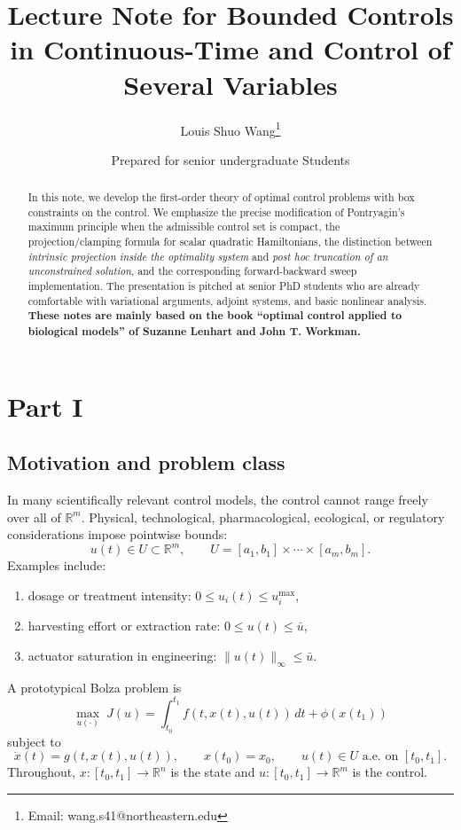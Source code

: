 \documentclass[11pt]{article}
\title{\textbf{Lecture Note for Bounded Controls in Continuous-Time and Control of Several Variables}}
\author{Louis Shuo Wang\thanks{Email: wang.s41@northeastern.edu}}
\affil{Department of Mathematics, Northeastern University, Boston, MA 02115, USA}
\date{Prepared for senior undergraduate Students}
\theoremstyle{definition}
\newcommand{\R}{\mathbb{R}}
\begin{document}
\maketitle

\begin{abstract}
In this note, we develop the first-order theory of optimal control problems with box constraints on the control. We emphasize the precise modification of Pontryagin's maximum principle when the admissible control set is compact, the projection/clamping formula for scalar quadratic Hamiltonians, the distinction between \emph{intrinsic projection inside the optimality system} and \emph{post hoc truncation of an unconstrained solution}, and the corresponding forward-backward sweep implementation. The presentation is pitched at senior PhD students who are already comfortable with variational arguments, adjoint systems, and basic nonlinear analysis. \textbf{These notes are mainly based on the book ``optimal control applied to biological models'' of Suzanne Lenhart and John T. Workman.}
\end{abstract}

\tableofcontents

\section{Part I}
\subsection{Motivation and problem class}

In many scientifically relevant control models, the control cannot range freely over all of $\R^m$. Physical, technological, pharmacological, ecological, or regulatory considerations impose pointwise bounds:
\[
u(t)\in U \subset \R^m,
\qquad
U = [a_1,b_1]\times \cdots \times [a_m,b_m].
\]
Examples include:
\begin{enumerate}[label=(\roman*)]
    \item dosage or treatment intensity: $0\le u_i(t)\le u_i^{\max}$,
    \item harvesting effort or extraction rate: $0\le u(t)\le \bar u$,
    \item actuator saturation in engineering: $\|u(t)\|_\infty \le \bar u$.
\end{enumerate}

A prototypical Bolza problem is
\begin{equation}
\label{eq:bolza}
\max_{u(\cdot)}\;
J(u)
=
\int_{t_0}^{t_1} f(t,x(t),u(t))\,dt + \phi(x(t_1))
\end{equation}
subject to
\begin{equation}
\label{eq:dynamics}
\dot x(t)=g(t,x(t),u(t)),
\qquad
x(t_0)=x_0,
\qquad
u(t)\in U \text{ a.e. on } [t_0,t_1].
\end{equation}
Throughout, $x:[t_0,t_1]\to \R^n$ is the state and $u:[t_0,t_1]\to \R^m$ is the control.
\end{document}

